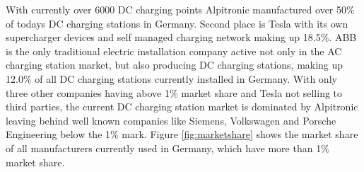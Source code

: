 \documentclass[conference,flushend]{iaria} %
\begin{document}
With currently over 6000 DC charging points Alpitronic manufactured over 50\% of todays DC charging stations in Germany.
Second place is Tesla with its own supercharger devices and self managed charging network making up 18.5\%.
ABB is the only traditional electric installation company active not only in the AC charging station market, but also producing DC charging stations, making up 12.0\% of all DC charging stations currently installed in Germany.
With only three other companies having above 1\% market share and Tesla not selling to third parties, the current DC charging station market is dominated by Alpitronic leaving behind well known companies like Siemens, Volkswagen and Porsche Engineering below the 1\% mark.
Figure \ref{fig:marketshare} shows the market share of all manufacturers currently used in Germany, which have more than 1\% market share.

\end{document}
